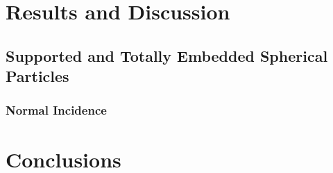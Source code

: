 \documentclass[11pt]{Latex/Classes/PhDthesisPSnPDF}
\begin{document}
%

\chapter{Results and Discussion}
	\label{ch:Results}

    \section{Supported and Totally Embedded Spherical Particles}
     \label{s:Totally}
        

        \subsection{Normal Incidence}
        
         \label{s:Totally:Normal}
       

\chapter*{Conclusions}
	\label{ch:Conclusions}
		
	
\end{document}
